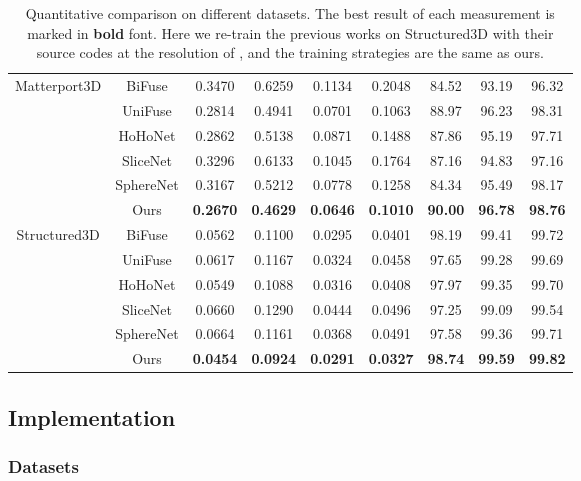 \documentclass[letterpaper]{article} \usepackage{aaai21}  \usepackage{times}  \usepackage{helvet} \usepackage{courier}  \usepackage[hyphens]{url}  \usepackage{graphicx} \urlstyle{rm} \def\UrlFont{\rm}  \usepackage{natbib}  \usepackage{caption} \frenchspacing  \setlength{\pdfpagewidth}{8.5in}  \setlength{\pdfpageheight}{11in}
\begin{document}
\begin{table*}[!htb]
\begin{tabular}{ccccccccc}
\midrule 
\multirow{6}{*}{Matterport3D} & BiFuse  & 0.3470 & 0.6259 & 0.1134 & 0.2048 & 84.52 & 93.19 & 96.32 \\
                            ~ & UniFuse & 0.2814 & 0.4941 & 0.0701 & 0.1063 & 88.97 & 96.23 & 98.31\\
                            ~ & HoHoNet & 0.2862 &  0.5138 & 0.0871 & 0.1488 & 87.86 & 95.19 & 97.71\\
                            ~ & SliceNet& 0.3296 & 0.6133 &  0.1045 & 0.1764 & 87.16 & 94.83 & 97.16\\
                            ~ & SphereNet & 0.3167 & 0.5212 & 0.0778 & 0.1258 & 84.34 & 95.49 & 98.17 \\
                            ~ & Ours    & \textbf{0.2670} & \textbf{0.4629} & \textbf{0.0646} & \textbf{0.1010} & \textbf{90.00} & \textbf{96.78} & \textbf{98.76}\\
\midrule
\multirow{6}{*}{Structured3D} & BiFuse  & 0.0562 & 0.1100 & 0.0295 & 0.0401 & 98.19 & 99.41 & 99.72 \\
                            ~ & UniFuse & 0.0617 & 0.1167 & 0.0324 & 0.0458 & 97.65 & 99.28 & 99.69 \\
                            ~ & HoHoNet & 0.0549 & 0.1088 & 0.0316 & 0.0408 & 97.97 & 99.35 & 99.70 \\
                            ~ & SliceNet& 0.0660 & 0.1290 & 0.0444 & 0.0496 & 97.25 & 99.09 & 99.54\\
                            ~ & SphereNet & 0.0664 & 0.1161 & 0.0368 & 0.0491 & 97.58 & 99.36 & 99.71 \\
                            ~ & Ours    & \textbf{0.0454} & \textbf{0.0924} & \textbf{0.0291} & \textbf{0.0327} & \textbf{98.74} & \textbf{99.59} & \textbf{99.82}\\
\bottomrule
    \end{tabular}
    \caption{Quantitative comparison on different datasets. The best result of each measurement is marked in \textbf{bold} font. Here we re-train the previous works on Structured3D with their source codes at the resolution of , and the training strategies are the same as ours.}
    \label{tab:comparison-1}
\end{table*}

\subsection{Implementation}
\subsubsection{Datasets}
\end{document}
